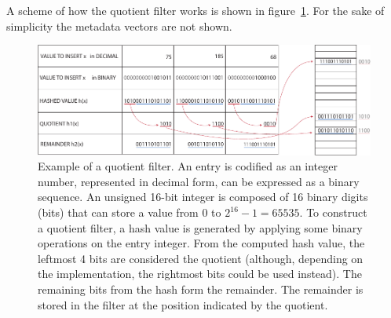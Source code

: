 A scheme of how the quotient filter works is shown in figure~\ref{fig:qf_ex}. For the sake of simplicity the metadata vectors are not shown.
\begin{figure}[h!]
	\centering
	\includegraphics[width=.95\linewidth]{figures/kmer_methods/quotient_filter_export.pdf}
	\caption[Example of a quotient filter.]{Example of a quotient filter. An entry is codified as an integer number, represented in decimal form, can be expressed as a binary sequence. An unsigned 16-bit integer is composed of 16 binary digits (bits) that can store a value from $0$ to $2^{16}-1 = 65535$. To construct a quotient filter, a hash value is generated by applying some binary operations on the entry integer. From the computed hash value, the leftmost 4 bits are considered the quotient (although, depending on the implementation, the rightmost bits could be used instead). The remaining bits from the hash form the remainder. The remainder is stored in the filter at the position indicated by the quotient. }
	\label{fig:qf_ex}
\end{figure}

